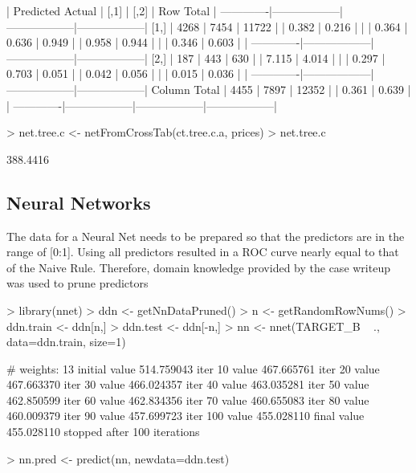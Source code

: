 \documentclass{article}
\begin{document}
\begin{Schunk}
\begin{Soutput}
 
             | Predicted 
      Actual |             [,1] |             [,2] |        Row Total | 
-------------|------------------|------------------|------------------|
        [1,] |             4268 |             7454 |            11722 | 
             |            0.382 |            0.216 |                  | 
             |            0.364 |            0.636 |            0.949 | 
             |            0.958 |            0.944 |                  | 
             |            0.346 |            0.603 |                  | 
-------------|------------------|------------------|------------------|
        [2,] |              187 |              443 |              630 | 
             |            7.115 |            4.014 |                  | 
             |            0.297 |            0.703 |            0.051 | 
             |            0.042 |            0.056 |                  | 
             |            0.015 |            0.036 |                  | 
-------------|------------------|------------------|------------------|
Column Total |             4455 |             7897 |            12352 | 
             |            0.361 |            0.639 |                  | 
-------------|------------------|------------------|------------------|
\end{Soutput}
\begin{Sinput}
> net.tree.c <- netFromCrossTab(ct.tree.c.a, prices)
> net.tree.c
\end{Sinput}
\begin{Soutput}
[1] 388.4416
\end{Soutput}
\end{Schunk}

\subsection*{Neural Networks}
The data for a Neural Net needs to be prepared so that the predictors are in the range of [0:1]. Using all predictors resulted in a ROC curve nearly equal to that of the Naive Rule. Therefore, domain knowledge provided by the case writeup was used to prune predictors

\begin{Schunk}
\begin{Sinput}
> library(nnet)
> ddn <- getNnDataPruned()
> n <- getRandomRowNums()
> ddn.train <- ddn[n,]
> ddn.test <- ddn[-n,]
> nn <- nnet(TARGET_B ~ ., data=ddn.train, size=1)
\end{Sinput}
\begin{Soutput}
# weights:  13
initial  value 514.759043 
iter  10 value 467.665761
iter  20 value 467.663370
iter  30 value 466.024357
iter  40 value 463.035281
iter  50 value 462.850599
iter  60 value 462.834356
iter  70 value 460.655083
iter  80 value 460.009379
iter  90 value 457.699723
iter 100 value 455.028110
final  value 455.028110 
stopped after 100 iterations
\end{Soutput}
\begin{Sinput}
> nn.pred <- predict(nn, newdata=ddn.test)
\end{Sinput}
\end{Schunk}
\end{document}
